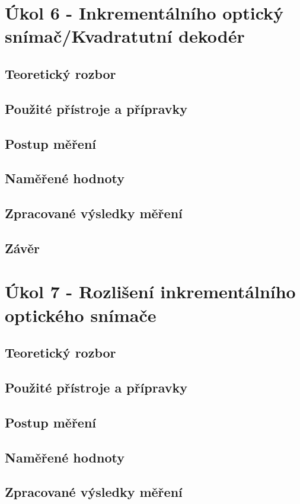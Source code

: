 \documentclass{protokol}
\begin{document}
\pagebreak


\section{Úkol 6 - Inkrementálního optický snímač/Kvadratutní dekodér}
    \subsection{Teoretický rozbor}
    \subsection{Použité přístroje a přípravky}
    \subsection{Postup měření}
    \subsection{Naměřené hodnoty}
    \subsection{Zpracované výsledky měření}
    \subsection{Závěr}

\pagebreak


\section{Úkol 7 - Rozlišení inkrementálního optického snímače}
    \subsection{Teoretický rozbor}
    \subsection{Použité přístroje a přípravky}
    \subsection{Postup měření}
    \subsection{Naměřené hodnoty}
    \subsection{Zpracované výsledky měření}
\end{document}
